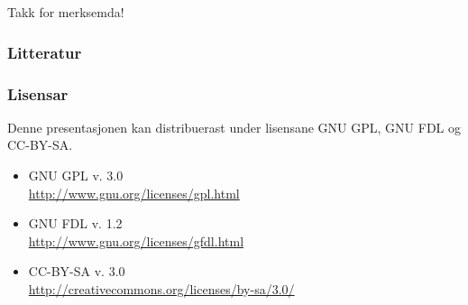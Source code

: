 \documentclass[xcolor=x11names,compress,bigger]{beamer}
\renewcommand{\(}{\begin{columns}}
\renewcommand{\)}{\end{columns}}
\newcommand{\<}[1]{\begin{column}{#1}}
\renewcommand{\>}{\end{column}}
\begin{document}
\begin{frame}
\end{frame}

\section*{} %
\begin{frame}
  \begin{center}
    {\huge Takk for merksemda!}
  \end{center}
\end{frame}

\begin{frame}\frametitle{Litteratur}
  \renewcommand{\bibfont}{\footnotesize}
  \nocite{dyvik2009lmp}
  
  
\end{frame}

\begin{frame}\frametitle{Lisensar}
  Denne presentasjonen kan distribuerast under lisensane
  GNU GPL, GNU FDL og CC-BY-SA.
  \begin{itemize}
  \item GNU GPL v. 3.0 \\
    \href{http://www.gnu.org/licenses/gpl.html}{http://www.gnu.org/licenses/gpl.html}
  \item GNU FDL v. 1.2 \\
    \href{http://www.gnu.org/licenses/gfdl.html}{http://www.gnu.org/licenses/gfdl.html}
  \item CC-BY-SA v. 3.0 \\
    \href{http://creativecommons.org/licenses/by-sa/3.0/}{http://creativecommons.org/licenses/by-sa/3.0/}
  \end{itemize}
\end{frame}
\end{document}
